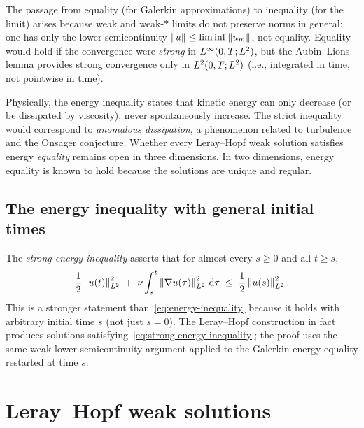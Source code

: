 \begin{remark}\label{rem:energy-equality-failure}
  The passage from equality (for Galerkin approximations) to inequality (for the limit)
  arises because weak and weak-$*$ limits do not preserve norms in general: one has only
  the lower semicontinuity $\left\lVert u \right\rVert \le \liminf \left\lVert u_{m} \right\rVert$, not equality.
  Equality would hold if the convergence were \emph{strong} in $L^{\infty}(0, T;
  L^{2})$, but the Aubin--Lions lemma provides strong convergence only in
  $L^{2}(0, T; L^{2})$ (i.e., integrated in time, not pointwise in time).

  Physically, the energy inequality states that kinetic energy can only decrease (or be
  dissipated by viscosity), never spontaneously increase.  The strict inequality would
  correspond to \emph{anomalous dissipation}, a phenomenon related to turbulence and the
  Onsager conjecture.  Whether every Leray--Hopf weak solution satisfies energy
  \emph{equality} remains open in three dimensions.  In two dimensions, energy equality
  is known to hold because the solutions are unique and regular.
\end{remark}

\subsection{The energy inequality with general initial times}

\begin{remark}\label{rem:strong-energy-inequality}
  The \emph{strong energy inequality} asserts that for almost every $s \ge 0$ and all
  $t \ge s$,
  \begin{equation}\label{eq:strong-energy-inequality}
    \frac{1}{2}\left\lVert u(t) \right\rVert_{L^{2}}^{2}
    \;+\;
    \nu \int_{s}^{t} \left\lVert \nabla u(\tau) \right\rVert_{L^{2}}^{2} \,\mathrm{d} \tau
    \;\le\;
    \frac{1}{2}\left\lVert u(s) \right\rVert_{L^{2}}^{2}.
  \end{equation}
  This is a stronger statement than~\eqref{eq:energy-inequality} because it holds with
  arbitrary initial time $s$ (not just $s = 0$).  The Leray--Hopf construction in fact
  produces solutions satisfying~\eqref{eq:strong-energy-inequality}; the proof uses the
  same weak lower semicontinuity argument applied to the Galerkin energy equality
  restarted at time $s$.
\end{remark}

\section{Leray--Hopf weak solutions}\label{sec:leray-hopf-def}

